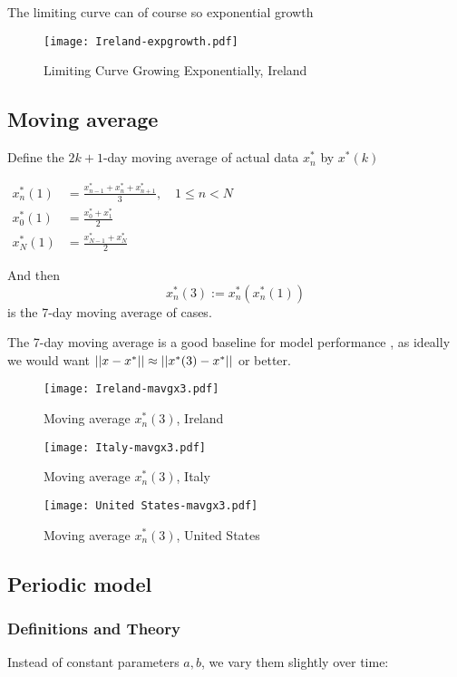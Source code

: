 The limiting curve can of course so exponential growth 

\begin{figure}[H]
\texttt{[image: Ireland-expgrowth.pdf]}
\endminipage 
\caption{Limiting Curve Growing Exponentially, Ireland}
\end{figure}

\subsection{Moving average}

Define the $2k+1$-day moving average of actual data $x_n^*$ by $x^*(k)$

$\begin{aligned}
x^*_n(1) &=\frac{x^*_{n-1} + x^*_n + x^*_{n+1}}{3},\quad 1\leq n < N \\
x^*_0(1) &=\frac{x^*_0 + x^*_1}{2}\\
x^*_N(1) &=\frac{x^*_{N-1} + x^*_N}{2}
\end{aligned}$

And then $$x_n^*(3):= x^*_n(x^*_n(1))$$ is the 7-day moving average of cases.

The 7-day moving average is a good baseline for model performance , as ideally we would want $\left|\left|x-x^*\right|\right|\approx\left|\left|x^*(3)-x^*\right|\right|$ or better.

\begin{figure}[H]
\texttt{[image: Ireland-mavgx3.pdf]}
\caption{Moving average $x^*_n (3)$, Ireland}
\endminipage 
{}
\texttt{[image: Italy-mavgx3.pdf]}
\caption{Moving average $x^*_n (3)$, Italy}
\endminipage 
{}
\texttt{[image: United States-mavgx3.pdf]}
\caption{Moving average $x^*_n (3)$, United States}
\endminipage 
\end{figure}

\subsection{Periodic model}

\subsubsection{Definitions and Theory}

Instead of constant parameters $a,b$, we vary them slightly over time:

